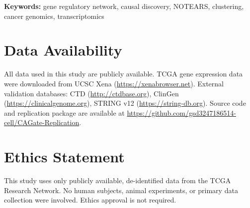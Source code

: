 \documentclass[12pt,a4paper]{article}
\begin{document}
\noindent\textbf{Keywords:} gene regulatory network, causal discovery, NOTEARS, clustering, cancer genomics, transcriptomics









\section*{Data Availability}




All data used in this study are publicly available. TCGA gene expression data were downloaded from UCSC Xena (\url{https://xenabrowser.net}). External validation databases: CTD (\url{http://ctdbase.org}), ClinGen (\url{https://clinicalgenome.org}), STRING v12 (\url{https://string-db.org}). Source code and replication package are available at \url{https://github.com/gsd3247186514-cell/CAGate-Replication}.









\section*{Ethics Statement}




This study uses only publicly available, de-identified data from the TCGA Research Network. No human subjects, animal experiments, or primary data collection were involved. Ethics approval is not required.

















\end{document}
